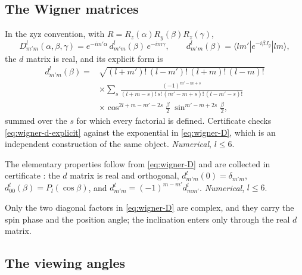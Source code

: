 \subsection{The Wigner matrices}
\label{sec:wigner-matrices}

In the zyz convention, with $R = R_z(\alpha) R_y(\beta) R_z(\gamma)$,
\begin{equation}
  D^l_{m'm}(\alpha,\beta,\gamma) = e^{-im'\alpha} \, d^l_{m'm}(\beta) \, e^{-im\gamma} ,
  \qquad
  d^l_{m'm}(\beta) = \langle l m' | e^{-i\beta J_y} | l m \rangle ,
  \label{eq:wigner-D}
\end{equation}
the $d$ matrix is real, and its explicit form is
\begin{equation}
\begin{split}
  d^l_{m'm}(\beta) = {}&
  \sqrt{(l+m')!\,(l-m')!\,(l+m)!\,(l-m)!} \\
  &\times \sum_s \frac{(-1)^{m'-m+s}}{(l+m-s)!\,s!\,(m'-m+s)!\,(l-m'-s)!} \\
  &\times \cos^{2l+m-m'-2s}\!\tfrac{\beta}{2}\;
  \sin^{m'-m+2s}\!\tfrac{\beta}{2},
\end{split}
  \label{eq:wigner-d-explicit}
\end{equation}
summed over the $s$ for which every factorial is defined.  Certificate 
checks \eqref{eq:wigner-d-explicit} against the exponential in
\eqref{eq:wigner-D}, which is an independent construction of the same object.
\emph{Numerical}, $l \le 6$.

The elementary properties follow from \eqref{eq:wigner-D} and are collected in
certificate : the $d$ matrix is real and orthogonal,
$d^l_{m'm}(0) = \delta_{m'm}$, $d^l_{00}(\beta) = P_l(\cos\beta)$, and
$d^l_{m'm} = (-1)^{m-m'} d^l_{mm'}$.  \emph{Numerical}, $l \le 6$.

Only the two diagonal factors in \eqref{eq:wigner-D} are complex, and they carry
the spin phase and the position angle; the inclination enters only through the
real $d$ matrix.

\subsection{The viewing angles}
\label{sec:viewing-angles}

